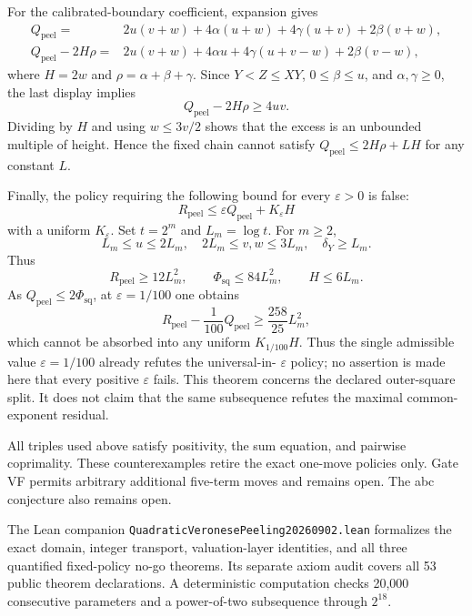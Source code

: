 For the calibrated-boundary coefficient, expansion gives
\begin{align}
 Q_{\mathrm{peel}}={}&2u(v+w)+4\alpha(u+w)+4\gamma(u+v)
                         +2\beta(v+w),
 \label{eq:qvp-q-formula}\\
 Q_{\mathrm{peel}}-2H\rho={}&2u(v+w)+4\alpha u
   +4\gamma(u+v-w)+2\beta(v-w),
 \label{eq:qvp-boundary-excess}
\end{align}
where $H=2w$ and $\rho=\alpha+\beta+\gamma$.  Since $Y<Z\leq XY$,
$0\leq\beta\leq u$, and $\alpha,\gamma\geq0$, the last display implies
\begin{equation}
 Q_{\mathrm{peel}}-2H\rho\geq4uv.
 \label{eq:qvp-boundary-lower}
\end{equation}
Dividing by $H$ and using $w\leq3v/2$ shows that the excess is an unbounded
multiple of height.  Hence the fixed chain cannot satisfy
$Q_{\mathrm{peel}}\leq2H\rho+LH$ for any constant $L$.

Finally, the policy requiring the following bound for every
$\varepsilon>0$ is false:
\[
 R_{\mathrm{peel}}\leq
 \varepsilon Q_{\mathrm{peel}}+K_\varepsilon H
\]
with a uniform $K_\varepsilon$.  Set $t=2^m$ and
$L_m=\log t$.  For $m\geq2$,
\[
 L_m\leq u\leq2L_m,
 \quad 2L_m\leq v,w\leq3L_m,
 \quad \delta_Y\geq L_m.
\]
Thus
\[
 R_{\mathrm{peel}}\geq12L_m^2,
 \qquad \Phi_{\mathrm{sq}}\leq84L_m^2,
 \qquad H\leq6L_m.
\]
As $Q_{\mathrm{peel}}\leq2\Phi_{\mathrm{sq}}$, at
$\varepsilon=1/100$ one obtains
\[
 R_{\mathrm{peel}}-\frac1{100}Q_{\mathrm{peel}}
 \geq\frac{258}{25}L_m^2,
\]
which cannot be absorbed into any uniform $K_{1/100}H$.  Thus the single
admissible value $\varepsilon=1/100$ already refutes the universal-in-
$\varepsilon$ policy; no assertion is made here that every positive
$\varepsilon$ fails.  This theorem concerns the
declared outer-square split.  It does not claim that the same subsequence
refutes the maximal common-exponent residual.

All triples used above satisfy positivity, the sum equation, and pairwise
coprimality.  These counterexamples retire the exact one-move policies only.
Gate VF permits arbitrary additional five-term moves and remains open.  The
abc conjecture also remains open.

The Lean companion
\texttt{QuadraticVeronesePeeling20260902.lean} formalizes the exact domain,
integer transport, valuation-layer identities, and all three quantified
fixed-policy no-go theorems.  Its separate axiom audit covers all 53 public
theorem declarations.  A deterministic computation checks 20,000
consecutive parameters and a power-of-two subsequence through $2^{18}$.
